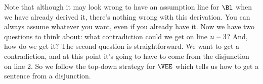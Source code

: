 \begin{gproof}
\end{gproof}
Note that although it may look wrong to have an assumption line for $\Bl$ when we have already derived it, there's nothing wrong with this derivation. 
You can always assume whatever you want, even if you already have it. 
Now we have two questions to think about: what contradiction could we get on line $n-3$? 
And, how do we get it? 
The second question is straightforward. 
We want to get a contradiction, and at this point it's going to have to come from the disjunction on line 2. 
So we follow the top-down strategy for $\VEE$ which tells us how to get a sentence from a disjunction.
\begin{gproof}
\end{gproof}
